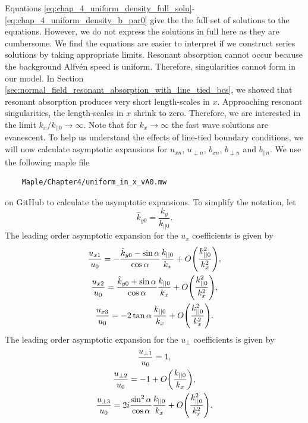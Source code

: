Equations \eqref{eq:chap_4_uniform_density_full_soln}-\eqref{eq:chap_4_uniform_density_b_par0} give the the full set of solutions to the equations. However, we do not express the solutions in full here as they are cumbersome. We find the equations are easier to interpret if we construct series solutions by taking appropriate limits. Resonant absorption cannot occur because the background Alfv\'en speed is uniform. Therefore, singularities cannot form in our model.
In Section \ref{sec:normal_field_resonant_absorption_with_line_tied_bcs}, we showed that resonant absorption produces very short length-scales in $x$. Approaching resonant singularities, the length-scales in $x$ shrink to zero. Therefore, we are interested in the limit $k_x/k_{||0}\rightarrow \infty$. Note that for $k_x\rightarrow\infty$ the fast wave solutions are evanescent. To help us understand the effects of line-tied boundary conditions, we will now calculate asymptotic expansions for $u_{xn}$, $u_{\perp n}$, $b_{x n}$, $b_{\perp n}$ and $b_{||n}$. We use the following maple file
\begin{verbatim}
    Maple/Chapter4/uniform_in_x_vA0.mw
\end{verbatim}
on GitHub to calculate the asymptotic expansions. 
To simplify the notation, let
\begin{equation}
    \hat{k}_{y0} = \frac{k_y}{k_{||0}}.
\end{equation}
The leading order asymptotic expansion for the $u_x$ coefficients is given by
\begin{gather}
    \label{eq:chap_4_oblique_ux1}
    \frac{u_{x1}}{u_0}= -\frac{\hat{k}_{y0}-\sin\alpha}{\cos\alpha}\frac{k_{||0}}{k_x} + O\qty(\frac{k_{||0}^2}{k_x^2}), \\
    \frac{u_{x2}}{u_0}= \frac{\hat{k}_{y0}+\sin\alpha}{\cos\alpha}\frac{k_{||0}}{k_x} + O\qty(\frac{k_{||0}^2}{k_x^2}), \\
    \label{eq:chap_4_oblique_ux3}
    \frac{u_{x3}}{u_0}= -2\tan\alpha\,\frac{k_{||0}}{k_x} + O\qty(\frac{k_{||0}^2}{k_x^2}).
\end{gather}
The leading order asymptotic expansion for the $u_\perp$ coefficients is given by
\begin{gather}
    \frac{u_{\perp1}}{u_0} = 1, \\
    \frac{u_{\perp2}}{u_0} = -1 + O\qty(\frac{k_{||0}}{k_x}), \\
    \frac{u_{\perp3}}{u_0} = 2i\frac{\sin^2\alpha}{\cos\alpha}\frac{k_{||0}}{k_x} + O\qty(\frac{k_{||0}^2}{k_x^2}).
\end{gather}

